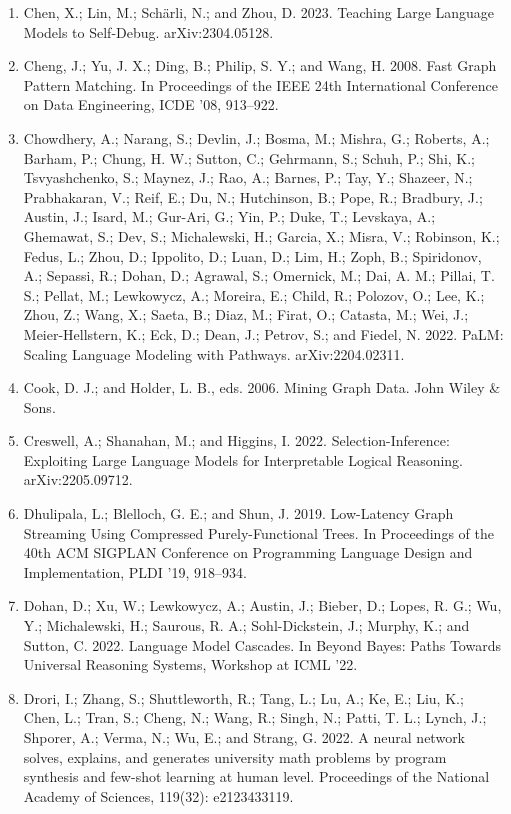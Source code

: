 \documentclass[11pt,UTF8,fontset=fandol]{ctexart}
\begin{document}
\begin{enumerate}[leftmargin=2em]
\item Chen, X.; Lin, M.; Schärli, N.; and Zhou, D. 2023. Teaching Large Language Models to Self-Debug. arXiv:2304.05128.
\item Cheng, J.; Yu, J. X.; Ding, B.; Philip, S. Y.; and Wang, H. 2008. Fast Graph Pattern Matching. In Proceedings of the IEEE 24th International Conference on Data Engineering, ICDE '08, 913--922.
\item Chowdhery, A.; Narang, S.; Devlin, J.; Bosma, M.; Mishra, G.; Roberts, A.; Barham, P.; Chung, H. W.; Sutton, C.; Gehrmann, S.; Schuh, P.; Shi, K.; Tsvyashchenko, S.; Maynez, J.; Rao, A.; Barnes, P.; Tay, Y.; Shazeer, N.; Prabhakaran, V.; Reif, E.; Du, N.; Hutchinson, B.; Pope, R.; Bradbury, J.; Austin, J.; Isard, M.; Gur-Ari, G.; Yin, P.; Duke, T.; Levskaya, A.; Ghemawat, S.; Dev, S.; Michalewski, H.; Garcia, X.; Misra, V.; Robinson, K.; Fedus, L.; Zhou, D.; Ippolito, D.; Luan, D.; Lim, H.; Zoph, B.; Spiridonov, A.; Sepassi, R.; Dohan, D.; Agrawal, S.; Omernick, M.; Dai, A. M.; Pillai, T. S.; Pellat, M.; Lewkowycz, A.; Moreira, E.; Child, R.; Polozov, O.; Lee, K.; Zhou, Z.; Wang, X.; Saeta, B.; Diaz, M.; Firat, O.; Catasta, M.; Wei, J.; Meier-Hellstern, K.; Eck, D.; Dean, J.; Petrov, S.; and Fiedel, N. 2022. PaLM: Scaling Language Modeling with Pathways. arXiv:2204.02311.
\item Cook, D. J.; and Holder, L. B., eds. 2006. Mining Graph Data. John Wiley \& Sons.
\item Creswell, A.; Shanahan, M.; and Higgins, I. 2022. Selection-Inference: Exploiting Large Language Models for Interpretable Logical Reasoning. arXiv:2205.09712.
\item Dhulipala, L.; Blelloch, G. E.; and Shun, J. 2019. Low-Latency Graph Streaming Using Compressed Purely-Functional Trees. In Proceedings of the 40th ACM SIGPLAN Conference on Programming Language Design and Implementation, PLDI '19, 918--934.
\item Dohan, D.; Xu, W.; Lewkowycz, A.; Austin, J.; Bieber, D.; Lopes, R. G.; Wu, Y.; Michalewski, H.; Saurous, R. A.; Sohl-Dickstein, J.; Murphy, K.; and Sutton, C. 2022. Language Model Cascades. In Beyond Bayes: Paths Towards Universal Reasoning Systems, Workshop at ICML '22.
\item Drori, I.; Zhang, S.; Shuttleworth, R.; Tang, L.; Lu, A.; Ke, E.; Liu, K.; Chen, L.; Tran, S.; Cheng, N.; Wang, R.; Singh, N.; Patti, T. L.; Lynch, J.; Shporer, A.; Verma, N.; Wu, E.; and Strang, G. 2022. A neural network solves, explains, and generates university math problems by program synthesis and few-shot learning at human level. Proceedings of the National Academy of Sciences, 119(32): e2123433119.

\end{enumerate}
\end{document}
